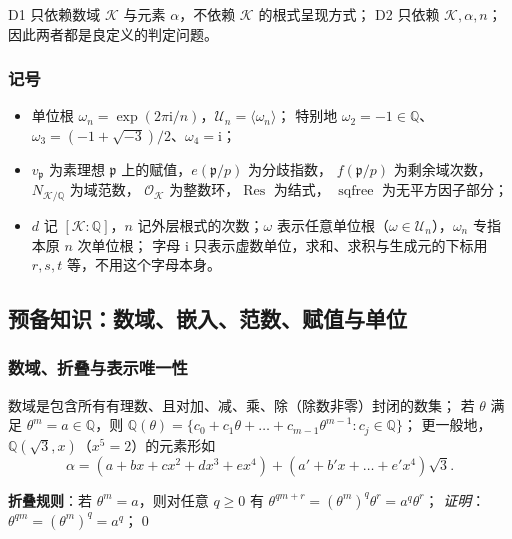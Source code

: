 \documentclass[UTF8,a4paper,11pt]{ctexart}
\newcommand{\ii}{\mathrm{i}}
\begin{document}
\begin{proposition}[内在性]
\label{prop:intrinsic}
D1 只依赖数域 $\mathscr{K}$ 与元素 $\alpha$，不依赖 $\mathscr{K}$ 的根式呈现方式；
D2 只依赖 $\mathscr{K},\alpha,n$；因此两者都是良定义的判定问题。
\end{proposition}

\subsubsection{记号}

\begin{itemize}
\item 单位根 $\omega_n=\exp(2\pi\ii/n)$，$\mathscr{U}_n=\langle\omega_n\rangle$；
特别地 $\omega_2=-1\in\mathbb{Q}$、$\omega_3=(-1+\sqrt{-3})/2$、$\omega_4=\ii$；
\item $v_{\mathfrak{p}}$ 为素理想 $\mathfrak{p}$ 上的赋值，$e(\mathfrak{p}/p)$ 为分歧指数，
$f(\mathfrak{p}/p)$ 为剩余域次数，$N_{\mathscr{K}/\mathbb{Q}}$ 为域范数，
$\mathscr{O}_{\mathscr{K}}$ 为整数环，$\operatorname{Res}$ 为结式，
$\operatorname{sqfree}$ 为无平方因子部分；
\item $d$ 记 $[\mathscr{K}:\mathbb{Q}]$，$n$ 记外层根式的次数；$\omega$ 表示任意单位根（$\omega\in\mathscr{U}_n$），$\omega_n$ 专指本原 $n$ 次单位根；
字母 $\ii$ 只表示虚数单位，求和、求积与生成元的下标用 $r,s,t$ 等，不用这个字母本身。
\end{itemize}
\subsection{预备知识：数域、嵌入、范数、赋值与单位}
\label{sec:prelim}

\subsubsection{数域、折叠与表示唯一性}

\begin{definition}[数域]
\label{def:numberfield}
数域是包含所有有理数、且对加、减、乘、除（除数非零）封闭的数集；
若 $\theta$ 满足 $\theta^m=a\in\mathbb{Q}$，则 $\mathbb{Q}(\theta)=\{c_0+c_1\theta+\dots+c_{m-1}\theta^{m-1}:c_j\in\mathbb{Q}\}$；
更一般地，$\mathbb{Q}(\sqrt3,x)$（$x^5=2$）的元素形如
\[
\alpha=(a+bx+cx^2+dx^3+ex^4)+(a'+b'x+\dots+e'x^4)\sqrt3 .
\]
\end{definition}

\textbf{折叠规则}：若 $\theta^m=a$，则对任意 $q\ge0$ 有 $\theta^{qm+r}=(\theta^m)^q\theta^r=a^q\theta^r$；
\emph{证明}：$\theta^{qm}=(\theta^m)^q=a^q$；\qed
\end{document}

